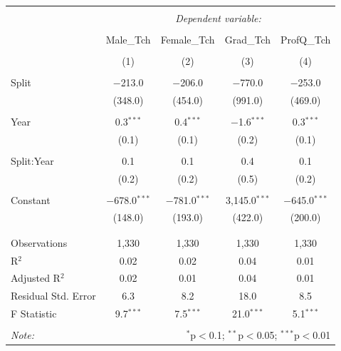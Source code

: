 \documentclass[12pt, a4paper]{article}
\begin{document}
\begin{table}[!htbp] \centering 
  \caption{} 
  \label{} 
\begin{tabular}{@{\extracolsep{5pt}}lcccc} 
\\[-1.8ex]\hline 
\hline \\[-1.8ex] 
 & \multicolumn{4}{c}{\textit{Dependent variable:}} \\ 
\cline{2-5} 
\\[-1.8ex] & Male\_Tch & Female\_Tch & Grad\_Tch & ProfQ\_Tch \\ 
\\[-1.8ex] & (1) & (2) & (3) & (4)\\ 
\hline \\[-1.8ex] 
 Split & $-$213.0 & $-$206.0 & $-$770.0 & $-$253.0 \\ 
  & (348.0) & (454.0) & (991.0) & (469.0) \\ 
  & & & & \\ 
 Year & 0.3$^{***}$ & 0.4$^{***}$ & $-$1.6$^{***}$ & 0.3$^{***}$ \\ 
  & (0.1) & (0.1) & (0.2) & (0.1) \\ 
  & & & & \\ 
 Split:Year & 0.1 & 0.1 & 0.4 & 0.1 \\ 
  & (0.2) & (0.2) & (0.5) & (0.2) \\ 
  & & & & \\ 
 Constant & $-$678.0$^{***}$ & $-$781.0$^{***}$ & 3,145.0$^{***}$ & $-$645.0$^{***}$ \\ 
  & (148.0) & (193.0) & (422.0) & (200.0) \\ 
  & & & & \\ 
\hline \\[-1.8ex] 
Observations & 1,330 & 1,330 & 1,330 & 1,330 \\ 
R$^{2}$ & 0.02 & 0.02 & 0.04 & 0.01 \\ 
Adjusted R$^{2}$ & 0.02 & 0.01 & 0.04 & 0.01 \\ 
Residual Std. Error & 6.3 & 8.2 & 18.0 & 8.5 \\ 
F Statistic & 9.7$^{***}$ & 7.5$^{***}$ & 21.0$^{***}$ & 5.1$^{***}$ \\ 
\hline 
\hline \\[-1.8ex] 
\textit{Note:}  & \multicolumn{4}{r}{$^{*}$p$<$0.1; $^{**}$p$<$0.05; $^{***}$p$<$0.01} \\ 
\end{tabular} 
\end{table} %
\end{document}
